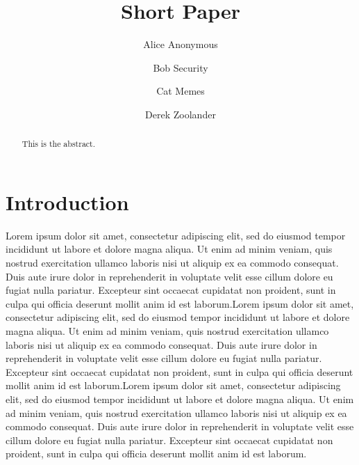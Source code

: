 \documentclass[]{elsarticle} %
\begin{document}
\begin{frontmatter}

  \title{Short Paper}
    \author[Some Institute of Technology]{Alice Anonymous}
    \author[Another University]{Bob Security}
    \author[Another University]{Cat Memes}
    \author[Some Institute of Technology]{Derek Zoolander}
      \address[Some Institute of Technology]{Department, Street, City, State, Zip}
    \address[Another University]{Department, Street, City, State, Zip}
  
  \begin{abstract}
  This is the abstract.
  \end{abstract}
  
 \end{frontmatter}

\hypertarget{introduction}{%
\section{Introduction}\label{introduction}}

Lorem ipsum dolor sit amet, consectetur adipiscing elit, sed do eiusmod
tempor incididunt ut labore et dolore magna aliqua. Ut enim ad minim
veniam, quis nostrud exercitation ullamco laboris nisi ut aliquip ex ea
commodo consequat. Duis aute irure dolor in reprehenderit in voluptate
velit esse cillum dolore eu fugiat nulla pariatur. Excepteur sint
occaecat cupidatat non proident, sunt in culpa qui officia deserunt
mollit anim id est laborum.Lorem ipsum dolor sit amet, consectetur
adipiscing elit, sed do eiusmod tempor incididunt ut labore et dolore
magna aliqua. Ut enim ad minim veniam, quis nostrud exercitation ullamco
laboris nisi ut aliquip ex ea commodo consequat. Duis aute irure dolor
in reprehenderit in voluptate velit esse cillum dolore eu fugiat nulla
pariatur. Excepteur sint occaecat cupidatat non proident, sunt in culpa
qui officia deserunt mollit anim id est laborum.Lorem ipsum dolor sit
amet, consectetur adipiscing elit, sed do eiusmod tempor incididunt ut
labore et dolore magna aliqua. Ut enim ad minim veniam, quis nostrud
exercitation ullamco laboris nisi ut aliquip ex ea commodo consequat.
Duis aute irure dolor in reprehenderit in voluptate velit esse cillum
dolore eu fugiat nulla pariatur. Excepteur sint occaecat cupidatat non
proident, sunt in culpa qui officia deserunt mollit anim id est laborum.
\end{document}
